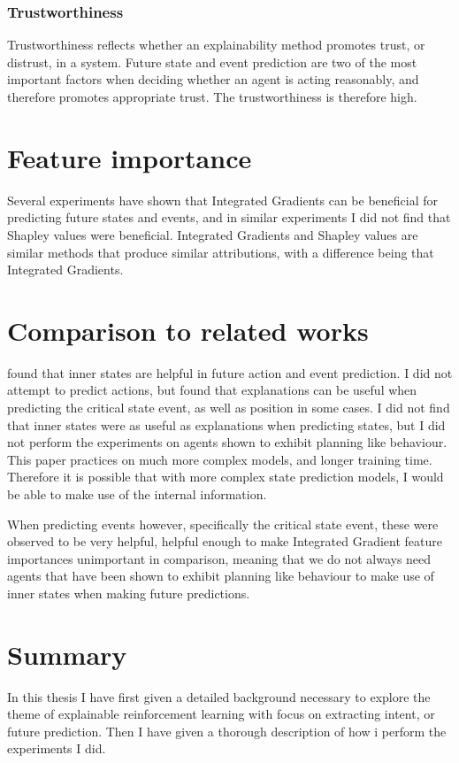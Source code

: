 \documentclass[UKenglish]{uiomasterthesis}
\begin{document}
\subsubsection{Trustworthiness}
Trustworthiness reflects whether an explainability method promotes trust, or distrust, in a system. Future state and event prediction are two of the most important factors when deciding whether an agent is acting reasonably, and therefore promotes appropriate trust. The trustworthiness is therefore high.

\section{Feature importance}
Several experiments have shown that Integrated Gradients can be beneficial for predicting future states and events, and in similar experiments I did not find that Shapley values were beneficial. Integrated Gradients and Shapley values are similar methods that produce similar attributions, with a difference being that Integrated Gradients.


\section{Comparison to related works}
\cite{chung2024predictingfutureactionsreinforcement} found that inner states are helpful in future action and event prediction. I did not attempt to predict actions, but found that explanations can be useful when predicting the critical state event, as well as position in some cases. I did not find that inner states were as useful as explanations when predicting states, but I did not perform the experiments on agents shown to exhibit planning like behaviour. This paper practices on much more complex models, and longer training time. Therefore it is possible that with more complex state prediction models, I would be able to make use of the internal information.

When predicting events however, specifically the critical state event, these were observed to be very helpful, helpful enough to make Integrated Gradient feature importances unimportant in comparison, meaning that we do not always need agents that have been shown to exhibit planning like behaviour to make use of inner states when making future predictions.


\section{Summary}
In this thesis I have first given a detailed background necessary to explore the theme of explainable reinforcement learning with focus on extracting intent, or future prediction. Then I have given a thorough description of how i perform the experiments I did.
\end{document}
